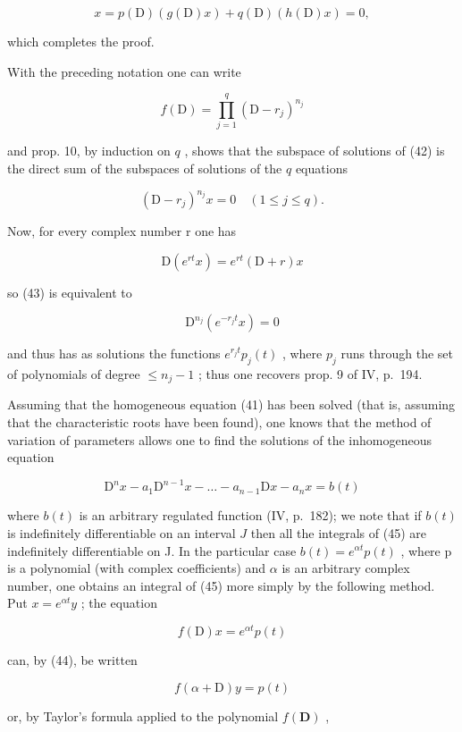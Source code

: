 \[
x = p (\mathrm{D}) (g (\mathrm{D}) x) + q (\mathrm{D}) (h (\mathrm{D}) x) = 0,
\]

which completes the proof.

With the preceding notation one can write

\[
f (\mathrm{D}) = \prod_ {j = 1} ^ {q} (\mathrm{D} - r _ {j}) ^ {n _ {j}}
\]

and prop. 10, by induction on \(q\) , shows that the subspace of solutions of (42) is the direct sum of the subspaces of solutions of the \(q\) equations

\[
(\mathrm{D} - r _ {j}) ^ {n _ {j}} x = 0 \quad (1 \leqslant j \leqslant q).\tag{43}
\]

Now, for every complex number r one has

\[
\mathrm{D} (e ^ {r t} x) = e ^ {r t} (\mathrm{D} + r) x\tag{44}
\]

so (43) is equivalent to

\[
\mathrm{D} ^ {n _ {j}} \left(e ^ {- r _ {j} t} x\right) = 0
\]

and thus has as solutions the functions \(e^{r_{j}t} p_{j}(t)\) , where \(p_{j}\) runs through the set of polynomials of degree \(\leqslant n_{j}-1\) ; thus one recovers prop. 9 of IV, p.~194.

Assuming that the homogeneous equation (41) has been solved (that is, assuming that the characteristic roots have been found), one knows that the method of variation of parameters allows one to find the solutions of the inhomogeneous equation

\[
\mathrm{D} ^ {n} x - a _ {1} \mathrm{D} ^ {n - 1} x - \dots - a _ {n - 1} \mathrm{D} x - a _ {n} x = b (t)\tag{45}
\]

where \(b(t)\) is an arbitrary regulated function (IV, p.~182); we note that if \(b(t)\) is indefinitely differentiable on an interval \(J\) then all the integrals of (45) are indefinitely differentiable on J. In the particular case \(b(t) = e^{\alpha t} p(t)\) , where p is a polynomial (with complex coefficients) and \(\alpha\) is an arbitrary complex number, one obtains an integral of (45) more simply by the following method. Put \(x = e^{\alpha t} y\) ; the equation

\[
f (\mathrm{D}) x = e ^ {\alpha t} p (t)
\]

can, by (44), be written

\[
f (\alpha + \mathrm{D}) y = p (t)
\]

or, by Taylor's formula applied to the polynomial \(f(\mathbf{D})\) ,


